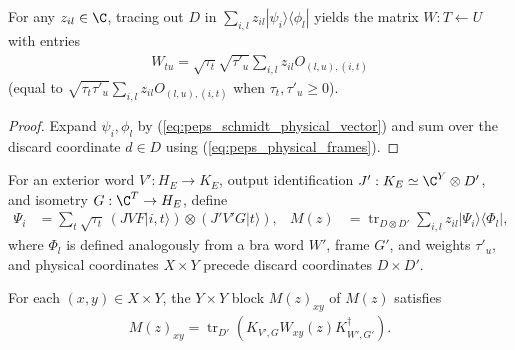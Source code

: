 \begin{lemma}
    \label{thm:peps_weighted_physical_source_identity}
    \leanok
    For any $z_{il}\in\C$, tracing out $D$ in
    $\sum_{i,l}z_{il}|\psi_i\rangle\langle\phi_l|$ yields the matrix
    $W:T\leftarrow U$ with entries
    \begin{align}
        W_{tu}=\sqrt{\tau_t}\sqrt{\tau'_u}\sum_{i,l}z_{il}O_{(l,u),(i,t)}
        \label{eq:peps_weighted_physical_source_identity}
    \end{align}
    (equal to $\sqrt{\tau_t\tau'_u}\sum_{i,l}z_{il}O_{(l,u),(i,t)}$ when
    $\tau_t,\tau'_u\ge 0$).
\end{lemma}

\begin{proof}\leanok
    Expand $\psi_i,\phi_l$ by (\ref{eq:peps_schmidt_physical_vector}) and sum
    over the discard coordinate $d\in D$ using (\ref{eq:peps_physical_frames}).
\end{proof}

\begin{definition}
    \label{def:peps_separated_physical_density}
    \leanok
    For an exterior word $V':H_E\to K_E$, output identification
    $J':K_E\simeq\C^Y\otimes D'$, and isometry $G:\C^T\to H_E$, define
    \begin{align}
        \Psi_i & =\sum_t\sqrt{\tau_t}\,(JVF|i,t\rangle)\otimes(J'V'G|t\rangle), &
        M(z)   & =\operatorname{tr}_{D\otimes D'}
        \sum_{i,l}z_{il}|\Psi_i\rangle\langle\Phi_l|,
        \label{eq:peps_separated_physical_density}
    \end{align}
    where $\Phi_l$ is defined analogously from a bra word $W'$, frame $G'$, and
    weights $\tau'_u$, and physical coordinates $X\times Y$ precede discard
    coordinates $D\times D'$.
\end{definition}

\begin{lemma}
    \label{thm:peps_separated_physical_density_blocks}
    \leanok
    For each $(x,y)\in X\times Y$, the $Y\times Y$ block $M(z)_{xy}$ of $M(z)$
    satisfies
    \begin{align}
        M(z)_{xy}=\operatorname{tr}_{D'}(K_{V',G}W_{xy}(z)K_{W',G'}^\dagger).
        \label{eq:peps_separated_physical_density_block}
    \end{align}
\end{lemma}

